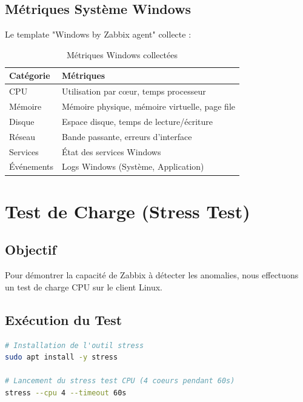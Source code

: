 \subsection{Métriques Système Windows}

Le template "Windows by Zabbix agent" collecte :

\begin{table}[H]
\centering
\caption{Métriques Windows collectées}
\label{tab:windows-metrics}
\begin{tabular}{|l|p{8cm}|}
\hline
\textbf{Catégorie} & \textbf{Métriques} \\
\hline
CPU & Utilisation par cœur, temps processeur \\
\hline
Mémoire & Mémoire physique, mémoire virtuelle, page file \\
\hline
Disque & Espace disque, temps de lecture/écriture \\
\hline
Réseau & Bande passante, erreurs d'interface \\
\hline
Services & État des services Windows \\
\hline
Événements & Logs Windows (Système, Application) \\
\hline
\end{tabular}
\end{table}

\section{Test de Charge (Stress Test)}

\subsection{Objectif}

Pour démontrer la capacité de Zabbix à détecter les anomalies, nous effectuons un test de charge CPU sur le client Linux.

\subsection{Exécution du Test}

\begin{lstlisting}[language=bash, caption=Installation et exécution de stress]
# Installation de l'outil stress
sudo apt install -y stress

# Lancement du stress test CPU (4 coeurs pendant 60s)
stress --cpu 4 --timeout 60s
\end{lstlisting}

